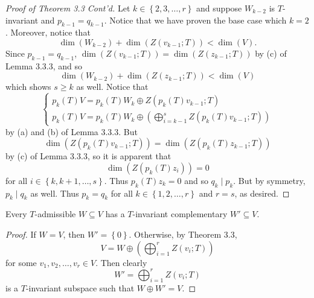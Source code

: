 \documentclass[math_245.tex]{subfiles}
\begin{document}
    \begin{proof}[Proof of Theorem 3.3 Cont'd]
        Let $k\in \left\lbrace 2,3,\ldots,r \right\rbrace$ and suppose $W_{k-2}$ is $T$-invariant and $p_{k-1} = q_{k-1}$. Notice that we have proven the base case which $k=2$. Moreover, notice that
        \begin{equation*}
            \dim\left( W_{k-2} \right) + \dim\left( Z\left( v_{k-1};T \right)  \right) < \dim(V).
        \end{equation*}
        Since $p_{k-1} = q_{k-1}$, $\dim\left( Z\left(v_{k-1};T\right) \right) = \dim\left( Z\left( z_{k-1};T \right)  \right)$ by (c) of Lemma 3.3.3, and so
        \begin{equation*}
            \dim\left( W_{k-2} \right) + \dim\left( Z\left( z_{k-1};T \right)  \right) < \dim(V)
        \end{equation*}
        which shows $s\geq k$ as well. Notice that
        \begin{equation*}
            \begin{cases} 
                p_k(T)V = p_k(T)W_k \oplus Z\left( p_k(T)v_{k-1};T \right)  \\ 
                p_k(T)V = p_k(T)W_k \oplus \left(\bigoplus^{s}_{i=k-1} Z\left( p_k(T)v_{k-1};T \right)\right) 
            \end{cases}
        \end{equation*}
        by (a) and (b) of Lemma 3.3.3. But
        \begin{equation*}
            \dim\left( Z\left( p_k(T)v_{k-1};T \right)  \right) = \dim\left( Z\left( p_k(T)z_{k-1};T \right) \right) 
        \end{equation*}
        by (c) of Lemma 3.3.3, so it is apparent that
        \begin{equation*}
            \dim\left( Z\left( p_k(T)z_i \right)  \right) = 0
        \end{equation*}
        for all $i\in \left\lbrace k, k+1, \ldots, s \right\rbrace$. Thus $p_k(T)z_k = 0$ and so $q_k\mid p_k$. But by symmetry, $p_k\mid q_k$ as well. Thus $p_k = q_k$ for all $k\in \left\lbrace 1,2,\ldots,r \right\rbrace$ and $r=s$, as desired.
    \end{proof}

    \begin{cor}{}
        Every $T$-admissible $W\subseteq V$ has a $T$-invariant complementary $W'\subseteq V$.
    \end{cor}	

    \begin{proof}
        If $W=V$, then $W'=\left\lbrace 0 \right\rbrace$. Otherwise, by Theorem 3.3,
        \begin{equation*}
            V = W\oplus \left( \bigoplus^{r}_{i=1} Z\left( v_i;T \right)  \right) 
        \end{equation*}
        for some $v_1,v_2,\ldots,v_r\in V$. Then clearly
        \begin{equation*}
            W' = \bigoplus^{r}_{i=1} Z(v_i;T)
        \end{equation*}
        is a $T$-invariant subspace such that $W\oplus W' = V$.
    \end{proof}
\end{document}
